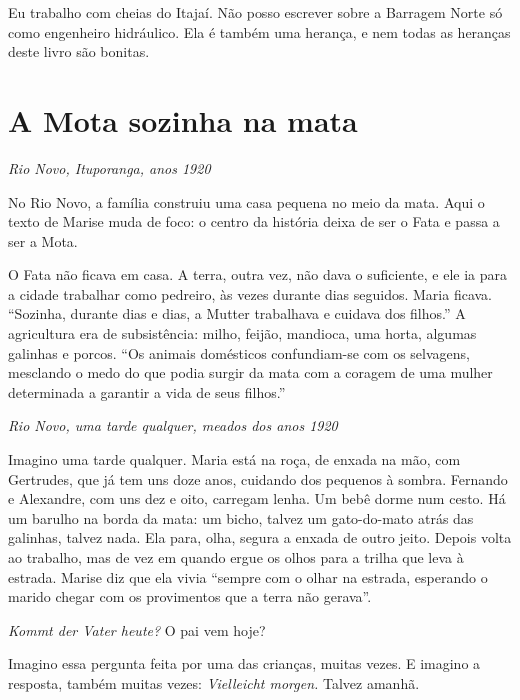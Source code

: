 \documentclass[
  brazilian,
  11pt,
  openany]{book}
\begin{document}
Eu trabalho com cheias do Itajaí. Não posso escrever sobre a Barragem
Norte só como engenheiro hidráulico. Ela é também uma herança, e nem
todas as heranças deste livro são bonitas.

\section{A Mota sozinha na mata}\label{a-mota-sozinha-na-mata}

\emph{Rio Novo, Ituporanga, anos 1920}

No Rio Novo, a família construiu uma casa pequena no meio da mata. Aqui
o texto de Marise muda de foco: o centro da história deixa de ser o Fata
e passa a ser a Mota.

O Fata não ficava em casa. A terra, outra vez, não dava o suficiente, e
ele ia para a cidade trabalhar como pedreiro, às vezes durante dias
seguidos. Maria ficava. ``Sozinha, durante dias e dias, a Mutter
trabalhava e cuidava dos filhos.'' A agricultura era de subsistência:
milho, feijão, mandioca, uma horta, algumas galinhas e porcos. ``Os
animais domésticos confundiam-se com os selvagens, mesclando o medo do
que podia surgir da mata com a coragem de uma mulher determinada a
garantir a vida de seus filhos.''

\emph{Rio Novo, uma tarde qualquer, meados dos anos 1920}

Imagino uma tarde qualquer. Maria está na roça, de enxada na mão, com
Gertrudes, que já tem uns doze anos, cuidando dos pequenos à sombra.
Fernando e Alexandre, com uns dez e oito, carregam lenha. Um bebê dorme
num cesto. Há um barulho na borda da mata: um bicho, talvez um
gato-do-mato atrás das galinhas, talvez nada. Ela para, olha, segura a
enxada de outro jeito. Depois volta ao trabalho, mas de vez em quando
ergue os olhos para a trilha que leva à estrada. Marise diz que ela
vivia ``sempre com o olhar na estrada, esperando o marido chegar com os
provimentos que a terra não gerava''.

\emph{Kommt der Vater heute?} O pai vem hoje?

Imagino essa pergunta feita por uma das crianças, muitas vezes. E
imagino a resposta, também muitas vezes: \emph{Vielleicht morgen.}
Talvez amanhã.
\end{document}
